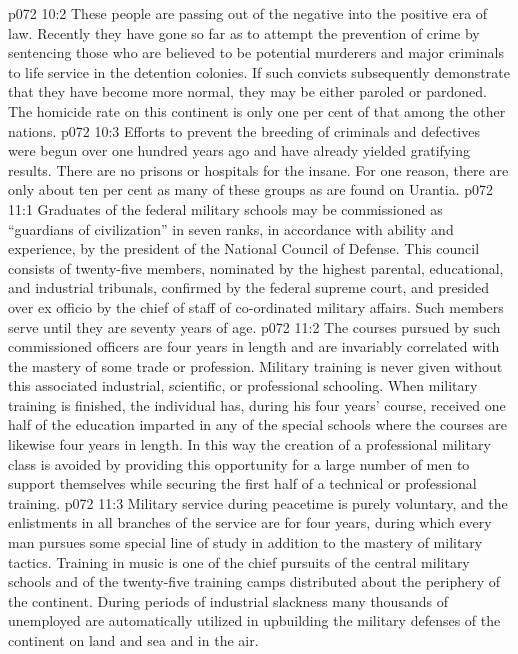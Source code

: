\vs p072 10:2 These people are passing out of the negative into the positive era of law. Recently they have gone so far as to attempt the prevention of crime by sentencing those who are believed to be potential murderers and major criminals to life service in the detention colonies. If such convicts subsequently demonstrate that they have become more normal, they may be either paroled or pardoned. The homicide rate on this continent is only one per cent of that among the other nations.
\vs p072 10:3 Efforts to prevent the breeding of criminals and defectives were begun over one hundred years ago and have already yielded gratifying results. There are no prisons or hospitals for the insane. For one reason, there are only about ten per cent as many of these groups as are found on Urantia.
\vs p072 11:1 Graduates of the federal military schools may be commissioned as “guardians of civilization” in seven ranks, in accordance with ability and experience, by the president of the National Council of Defense. This council consists of twenty\hyp{}five members, nominated by the highest parental, educational, and industrial tribunals, confirmed by the federal supreme court, and presided over ex officio by the chief of staff of co\hyp{}ordinated military affairs. Such members serve until they are seventy years of age.
\vs p072 11:2 The courses pursued by such commissioned officers are four years in length and are invariably correlated with the mastery of some trade or profession. Military training is never given without this associated industrial, scientific, or professional schooling. When military training is finished, the individual has, during his four years’ course, received one half of the education imparted in any of the special schools where the courses are likewise four years in length. In this way the creation of a professional military class is avoided by providing this opportunity for a large number of men to support themselves while securing the first half of a technical or professional training.
\vs p072 11:3 Military service during peacetime is purely voluntary, and the enlistments in all branches of the service are for four years, during which every man pursues some special line of study in addition to the mastery of military tactics. Training in music is one of the chief pursuits of the central military schools and of the twenty\hyp{}five training camps distributed about the periphery of the continent. During periods of industrial slackness many thousands of unemployed are automatically utilized in upbuilding the military defenses of the continent on land and sea and in the air.\plusone
